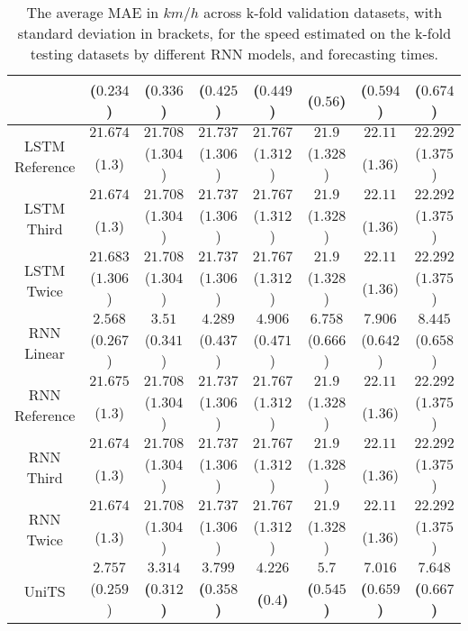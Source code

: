 \begin{table}[!ht]
{\begin{tabular}{|c|c|c|c|c|c|c|c|}
			 & \textbf{(}$\mathbf{0.234}$\textbf{)} & ($0.336$) & ($0.425$) & ($0.449$) & ($0.56$) & ($0.594$) & ($0.674$) \\ \hline
			\multirow{2}{*}{LSTM Reference} & $21.674$ & $21.708$ & $21.737$ & $21.767$ & $21.9$ & $22.11$ & $22.292$ \\
			 & ($1.3$) & ($1.304$) & ($1.306$) & ($1.312$) & ($1.328$) & ($1.36$) & ($1.375$) \\ \hline
			\multirow{2}{*}{LSTM Third} & $21.674$ & $21.708$ & $21.737$ & $21.767$ & $21.9$ & $22.11$ & $22.292$ \\
			 & ($1.3$) & ($1.304$) & ($1.306$) & ($1.312$) & ($1.328$) & ($1.36$) & ($1.375$) \\ \hline
			\multirow{2}{*}{LSTM Twice} & $21.683$ & $21.708$ & $21.737$ & $21.767$ & $21.9$ & $22.11$ & $22.292$ \\
			 & ($1.306$) & ($1.304$) & ($1.306$) & ($1.312$) & ($1.328$) & ($1.36$) & ($1.375$) \\ \hline
			\multirow{2}{*}{RNN Linear} & $2.568$ & $3.51$ & $4.289$ & $4.906$ & $6.758$ & $7.906$ & $8.445$ \\
			 & ($0.267$) & ($0.341$) & ($0.437$) & ($0.471$) & ($0.666$) & ($0.642$) & ($0.658$) \\ \hline
			\multirow{2}{*}{RNN Reference} & $21.675$ & $21.708$ & $21.737$ & $21.767$ & $21.9$ & $22.11$ & $22.292$ \\
			 & ($1.3$) & ($1.304$) & ($1.306$) & ($1.312$) & ($1.328$) & ($1.36$) & ($1.375$) \\ \hline
			\multirow{2}{*}{RNN Third} & $21.674$ & $21.708$ & $21.737$ & $21.767$ & $21.9$ & $22.11$ & $22.292$ \\
			 & ($1.3$) & ($1.304$) & ($1.306$) & ($1.312$) & ($1.328$) & ($1.36$) & ($1.375$) \\ \hline
			\multirow{2}{*}{RNN Twice} & $21.674$ & $21.708$ & $21.737$ & $21.767$ & $21.9$ & $22.11$ & $22.292$ \\
			 & ($1.3$) & ($1.304$) & ($1.306$) & ($1.312$) & ($1.328$) & ($1.36$) & ($1.375$) \\ \hline
			\multirow{2}{*}{UniTS} & $2.757$ & $\mathbf{3.314}$ & $\mathbf{3.799}$ & $\mathbf{4.226}$ & $\mathbf{5.7}$ & $\mathbf{7.016}$ & $\mathbf{7.648}$ \\
			 & ($0.259$) & \textbf{(}$\mathbf{0.312}$\textbf{)} & \textbf{(}$\mathbf{0.358}$\textbf{)} & \textbf{(}$\mathbf{0.4}$\textbf{)} & \textbf{(}$\mathbf{0.545}$\textbf{)} & \textbf{(}$\mathbf{0.659}$\textbf{)} & \textbf{(}$\mathbf{0.667}$\textbf{)} \\ \hline
		\end{tabular}
	}
	\caption{The average MAE in $km/h$ across k-fold validation datasets, with standard deviation in brackets, for the speed estimated on the k-fold testing datasets by different RNN models, and forecasting times.}
	\label{tab:all_speed_MAE}
\end{table}
